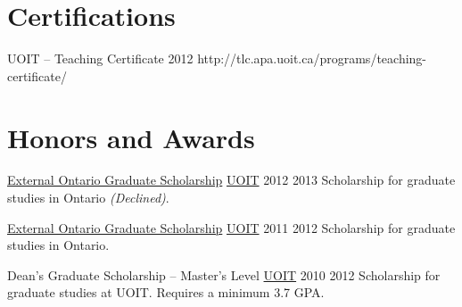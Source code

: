 
  \section{Certifications}

  \certificationEntry
    {UOIT -- Teaching Certificate }
    {2012}
    {}
    {http://tlc.apa.uoit.ca/programs/teaching-certificate/}

  \section{Honors and Awards}{}

  \honorsAwardsEntry
    {\href{https://osap.gov.on.ca/OSAPPortal/en/A-ZListofAid/TCONT003465.html}{External Ontario Graduate Scholarship}}
    {\href{http://uoit.ca/}{UOIT}}
    {2012}
    {2013}
    {Scholarship for graduate studies in Ontario \textit{(Declined)}.}

  \honorsAwardsEntry
    {\href{https://osap.gov.on.ca/OSAPPortal/en/A-ZListofAid/TCONT003465.html}{External Ontario
Graduate Scholarship}}
    {\href{http://uoit.ca/}{UOIT}}
    {2011}
    {2012}
    {Scholarship for graduate studies in Ontario.}

  \honorsAwardsEntry
    {Dean's Graduate Scholarship -- Master's Level}
    {\href{http://uoit.ca/}{UOIT}}
    {2010}
    {2012}
    {Scholarship for graduate studies at UOIT. Requires a minimum 3.7 GPA.}

